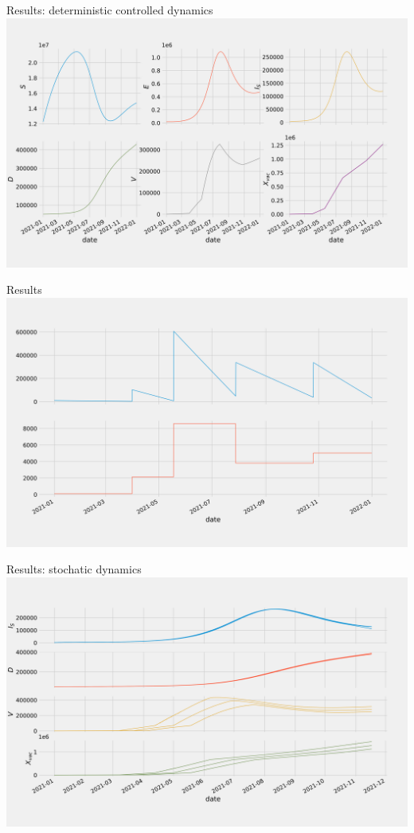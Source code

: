 \begin{frame}{Results: deterministic controlled dynamics}
    \centering
    \includegraphics[width=1.05\linewidth]{assets/det_states.png}
\end{frame}

\begin{frame}{Results}
    \centering
    \includegraphics[width=1.05\linewidth]{assets/det_policy.png}
\end{frame}

\begin{frame}{Results: stochatic dynamics}
    \centering
    \includegraphics[width=1.05\linewidth]{assets/ci_states.png}
\end{frame}

